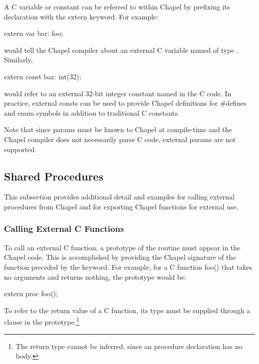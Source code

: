 A C variable or constant can be referred to within Chapel by prefixing
its declaration with the extern keyword.  For example:
\begin{chapel}
    extern var bar: foo;
\end{chapel}
\noindent
would tell the Chapel compiler about an external C variable named
 of type .  Similarly,
\begin{chapel}
   extern const baz: int(32);
\end{chapel}
would refer to an external 32-bit integer constant named  in the
C code.  In practice, external consts can be used to provide Chapel
definitions for \#defines and enum symbols in addition to traditional C
constants.

\begin{craychapel}
Note that since params must be known to Chapel at compile-time and
the Chapel compiler does not necessarily parse C code,
external params are not supported.
\end{craychapel}

\subsection{Shared Procedures}
\label{Shared_Procedures}

This subsection provides additional detail and examples for calling external
procedures from Chapel and for exporting Chapel functions for external use.

\subsubsection{Calling External C Functions}
\label{Calling_External_C_Functions}

To call an external C function, a prototype of
the routine must appear in the Chapel code.  This is accomplished by providing
the Chapel signature of the function preceded by the  keyword.  For
example, for a C function foo() that takes no arguments and returns
nothing, the prototype would be:
\begin{chapel}
       extern proc foo();
\end{chapel}

To refer to the return value of a C function, its type must be supplied through
a  clause in the prototype.\footnote{The return type cannot be
inferred, since an  procedure declaration has no body.}

